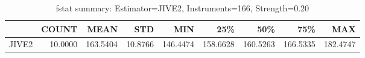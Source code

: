 \begin{table}[ht]
\centering
\caption{fstat summary: Estimator=JIVE2, Instruments=166, Strength=0.20}
\begin{tabular}{lrrrrrrrr}
\toprule
 & COUNT & MEAN & STD & MIN & 25\% & 50\% & 75\% & MAX \\
\midrule
JIVE2 & 10.0000 & 163.5404 & 10.8766 & 146.4474 & 158.6628 & 160.5263 & 166.5335 & 182.4747 \\
\bottomrule
\end{tabular}
\end{table}
